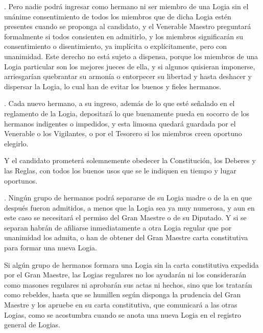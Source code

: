 \documentclass[a4paper,12pt,twoside]{book}
\begin{document}
\vspace{0.3cm}

. Pero nadie podrá ingresar como hermano ni ser miembro de una Logia sin el unánime consentimiento de todos los miembros que de dicha Logia estén presentes cuando se proponga al candidato, y el Venerable Maestro preguntará formalmente si todos consienten en admitirlo, y los miembros significarán su consentimiento o disentimiento, ya implícita o explícitamente, pero con unanimidad. Este derecho no está sujeto a dispensa, porque los miembros de una Logia particular son los mejores jueces de ella, y si algunos quisieran imponerse, arriesgarían quebrantar su armonía o entorpecer su libertad y hasta deshacer y dispersar la Logia, lo cual han de evitar los buenos y fieles hermanos.

\vspace{0.3cm}

. Cada nuevo hermano, a su ingreso, además de lo que esté señalado en el reglamento de la Logia, depositará lo que buenamente pueda en socorro de los hermanos indigentes o impedidos, y esta limosna quedará guardada por el Venerable o los Vigilantes, o por el Tesorero si los miembros creen oportuno elegirlo.

\noindent Y el candidato prometerá solemnemente obedecer la Constitución, los Deberes y las Reglas, con todos los buenos usos que se le indiquen en tiempo y lugar oportunos.

\vspace{0.3cm}

. Ningún grupo de hermanos podrá separarse de su Logia madre o de la en que después fueron admitidos, a menos que la Logia sea ya muy numerosa, y aun en este caso se necesitará el permiso del Gran Maestre o de su Diputado. Y si se separan habrán de afiliarse inmediatamente a otra Logia regular que por unanimidad los admita, o han de obtener del Gran Maestre carta constitutiva para formar una nueva Logia.

\noindent Si algún grupo de hermanos formara una Logia sin la carta constitutiva expedida por el Gran Maestre, las Logias regulares no los ayudarán ni los considerarán como masones regulares ni aprobarán sus actas ni hechos, sino que los tratarán como rebeldes, hasta que se humillen según disponga la prudencia del Gran Maestre y los apruebe en su carta constitutiva, que comunicará a las otras Logias, como se acostumbra cuando se anota una nueva Logia en el registro general de Logias.

\vspace{0.3cm}
\end{document}
